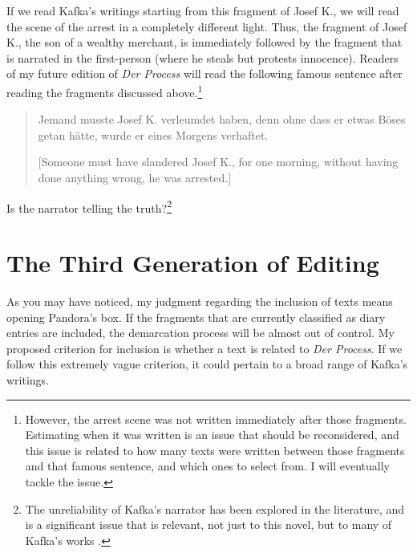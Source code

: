 \begin{paper}
If we read Kafka's writings starting from this fragment of Josef K., we
will read the scene of the arrest in a completely different light. Thus,
the fragment of Josef K., the son of a wealthy merchant, is immediately
followed by the fragment that is narrated in the first-person (where he
steals but protests innocence). Readers of my future edition of
\emph{Der Process} will read the following famous sentence after reading the
fragments discussed above.\footnote{However, the arrest scene was not written
  immediately after those fragments. Estimating when it was written is
  an issue that should be reconsidered, and this issue is related to how
  many texts were written between those fragments and that famous
  sentence, and which ones to select from. I will eventually tackle the
  issue.}

\begin{quote}
Jemand musste Josef K. verleumdet haben, denn ohne dass er etwas Böses
getan hätte, wurde er eines Morgens verhaftet. 

\begin{flushright}
    \parencite[7]{kafka_proces_1990-1}
\end{flushright}

{[}Someone must have slandered Josef K., for one morning, without having
done anything wrong, he was arrested.{]} 

\begin{flushright}
    \parencite[5]{kafka_trial_2009}
\end{flushright}

\end{quote}

Is the narrator telling the truth?\footnote{The unreliability of Kafka's narrator has been explored in the literature, and is a significant issue that is relevant, not just to this novel, but to many of Kafka's works \citep[see][]{myojo_kafka_2014}.}

\section{The Third Generation of
Editing}\label{the-third-generation-of-editing}

As you may have noticed, my judgment regarding the inclusion of texts
means opening Pandora's box. If the fragments that are currently
classified as diary entries are included, the demarcation process will
be almost out of control. My proposed criterion for inclusion is whether
a text is related to \emph{Der Process}. If we follow this extremely
vague criterion, it could pertain to a broad range of Kafka's writings.


\end{paper}
